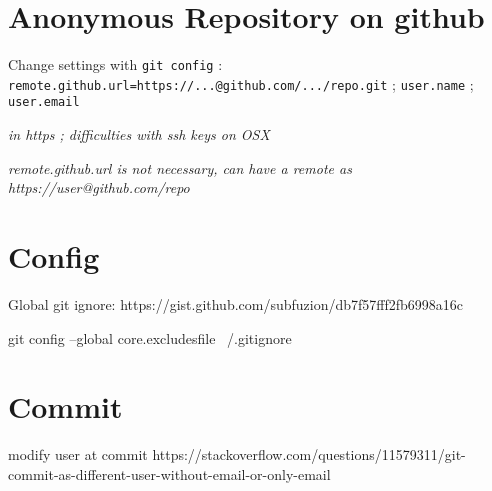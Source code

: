 \section*{Anonymous Repository on github}

Change settings with \texttt{git config} : \texttt{remote.github.url=https://...@github.com/.../repo.git} ; \texttt{user.name} ; \texttt{user.email}

\textit{in https ; difficulties with ssh keys on OSX}

\textit{remote.github.url is not necessary, can have a remote as https://user@github.com/repo}



\section*{Config}

Global git ignore: https://gist.github.com/subfuzion/db7f57fff2fb6998a16c

git config --global core.excludesfile ~/.gitignore


\section*{Commit}

modify user at commit https://stackoverflow.com/questions/11579311/git-commit-as-different-user-without-email-or-only-email













